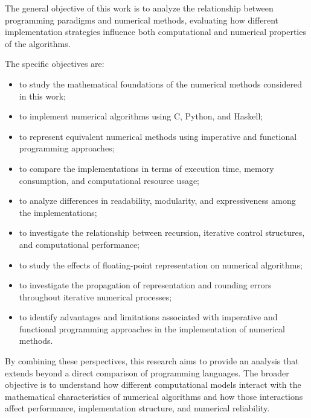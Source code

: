 The general objective of this work is to analyze the relationship between
programming paradigms and numerical methods, evaluating how different
implementation strategies influence both computational and numerical
properties of the algorithms.

The specific objectives are:

\begin{itemize}
    \item to study the mathematical foundations of the numerical methods
    considered in this work;

    \item to implement numerical algorithms using C, Python, and Haskell;

    \item to represent equivalent numerical methods using imperative and
    functional programming approaches;

    \item to compare the implementations in terms of execution time, memory
    consumption, and computational resource usage;

    \item to analyze differences in readability, modularity, and expressiveness
    among the implementations;

    \item to investigate the relationship between recursion, iterative control
    structures, and computational performance;

    \item to study the effects of floating-point representation on numerical
    algorithms;

    \item to investigate the propagation of representation and rounding errors
    throughout iterative numerical processes;

    \item to identify advantages and limitations associated with imperative and
    functional programming approaches in the implementation of numerical
    methods.
\end{itemize}

By combining these perspectives, this research aims to provide an analysis
that extends beyond a direct comparison of programming languages. The broader
objective is to understand how different computational models interact with
the mathematical characteristics of numerical algorithms and how those
interactions affect performance, implementation structure, and numerical
reliability.